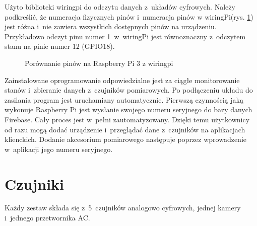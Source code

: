 Użyto biblioteki wiringpi do odczytu danych z~układów cyfrowych. Należy podkreślić, że numeracja fizycznych pinów i~numeracja pinów w wiringPi(rys. \ref{piny}) jest różna i~nie zawiera wszystkich dostępnych pinów na urządzeniu. Przykładowo odczyt pinu numer 1~w~wiringPi jest równoznaczny z~odczytem stanu na pinie numer 12 (GPIO18).
\begin{figure}[H]
    \centering
    \hfill
    \caption{Porównanie pinów na Raspberry Pi 3\cite{gpio} z wiringpi\cite{wiringpi}}
    \label{piny}
\end{figure}

Zainstalowane oprogramowanie odpowiedzialne jest za ciągłe monitorowanie stanów i~zbieranie danych z~czujników pomiarowych. Po podłączeniu układu do zasilania program jest uruchamiany automatycznie. Pierwszą czynnością jaką wykonuje Raspberry Pi jest wysłanie swojego numeru seryjnego do bazy danych Firebase. Cały proces jest w~pełni zautomatyzowany. Dzięki temu użytkownicy od razu mogą dodać urządzenie i~przeglądać dane z~czujników na aplikacjach klienckich. Dodanie akcesorium pomiarowego następuje poprzez wprowadzenie w~aplikacji jego numeru seryjnego.
\section{Czujniki}
Każdy zestaw składa się z~5~czujników analogowo cyfrowych,  jednej kamery i~jednego przetwornika AC. 
